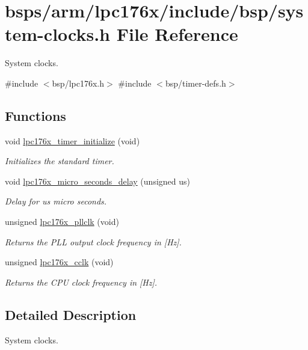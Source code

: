 \hypertarget{lpc176x_2include_2bsp_2system-clocks_8h}{}\section{bsps/arm/lpc176x/include/bsp/system-\/clocks.h File Reference}
\label{lpc176x_2include_2bsp_2system-clocks_8h}


System clocks.  


{\ttfamily \#include $<$bsp/lpc176x.\+h$>$}\newline
{\ttfamily \#include $<$bsp/timer-\/defs.\+h$>$}\newline
\subsection*{Functions}
\begin{DoxyCompactItemize}
\item 
void \mbox{\hyperlink{group__lpc176x__clock_ga36b647bb6e1c61bb2b688eab520effc7}{lpc176x\+\_\+timer\+\_\+initialize}} (void)
\begin{DoxyCompactList}\small\item\em Initializes the standard timer. \end{DoxyCompactList}\item 
void \mbox{\hyperlink{group__lpc176x__clock_gac77b85bc6bddf82f57b59d4c340fbd24}{lpc176x\+\_\+micro\+\_\+seconds\+\_\+delay}} (unsigned us)
\begin{DoxyCompactList}\small\item\em Delay for {\itshape us} micro seconds. \end{DoxyCompactList}\item 
unsigned \mbox{\hyperlink{group__lpc176x__clock_ga1838b91b836f6ac5a926f2976cc3ff91}{lpc176x\+\_\+pllclk}} (void)
\begin{DoxyCompactList}\small\item\em Returns the P\+LL output clock frequency in \mbox{[}Hz\mbox{]}. \end{DoxyCompactList}\item 
unsigned \mbox{\hyperlink{group__lpc176x__clock_gabd5c49363477314782dd3ce3521962b1}{lpc176x\+\_\+cclk}} (void)
\begin{DoxyCompactList}\small\item\em Returns the C\+PU clock frequency in \mbox{[}Hz\mbox{]}. \end{DoxyCompactList}\end{DoxyCompactItemize}


\subsection{Detailed Description}
System clocks. 

